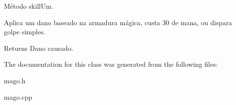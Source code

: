 Método skill\+Um. 

Aplica um dano baseado na armadura mágica, custa 30 de mana, ou dispara golpe simples. \begin{DoxyReturn}{Returns}
Dano causado. 
\end{DoxyReturn}


The documentation for this class was generated from the following files\+:\begin{DoxyCompactItemize}
\item 
mago.\+h\item 
mago.\+cpp\end{DoxyCompactItemize}
